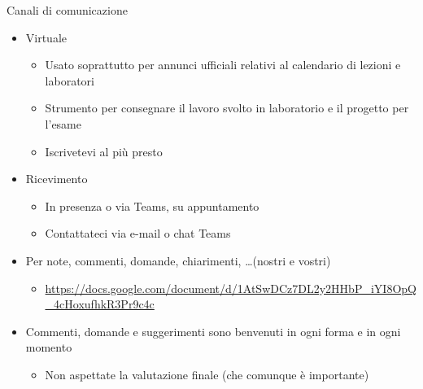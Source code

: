 \begin{frame}{Canali di comunicazione}

  \begin{itemize}[<+->]
  \item Virtuale

    \begin{itemize}[<.->]
    \item Usato soprattutto per annunci ufficiali relativi al calendario di
      lezioni e laboratori
    \item Strumento per consegnare il lavoro svolto in laboratorio e il progetto
      per l'esame
    \item Iscrivetevi al più presto
    \end{itemize}

  \item Ricevimento

    \begin{itemize}[<.->]
    \item In presenza o via Teams, su appuntamento
    \item Contattateci via e-mail o chat Teams
    \end{itemize}

  \item Per note, commenti, domande, chiarimenti, \ldots (nostri e vostri)
    \begin{itemize}[<.->]
    \item \url{https://docs.google.com/document/d/1AtSwDCz7DL2y2HHbP_iYI8OpQ_4cHoxufhkR3Pr9c4c}
    \end{itemize}

  \item Commenti, domande e suggerimenti sono benvenuti in ogni forma e in ogni
    momento
    \begin{itemize}[<.->]
    \item Non aspettate la valutazione finale (che comunque è importante)
    \end{itemize}

  \end{itemize}

\end{frame}

